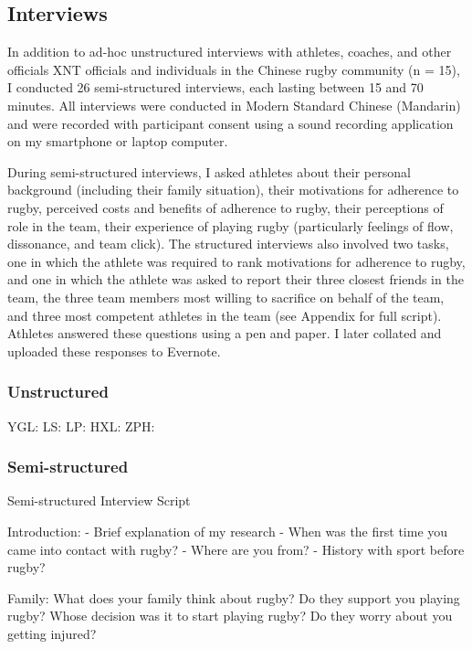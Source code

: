   \subsection{Interviews}

  In addition to ad-hoc unstructured interviews with athletes, coaches, and other officials XNT officials and individuals in the Chinese rugby community (n = 15), I conducted 26 semi-structured interviews, each lasting between 15 and 70 minutes.  All interviews were conducted in Modern Standard Chinese (Mandarin) and were recorded with participant consent using a sound recording application on my smartphone or laptop computer.

  During semi-structured interviews, I asked athletes about their personal background (including their family situation), their motivations for adherence to rugby, perceived costs and benefits of adherence to rugby, their perceptions of role in the team, their experience of playing rugby (particularly feelings of flow, dissonance, and team click).  The structured interviews also involved two tasks, one in which the athlete was required to rank motivations for adherence to rugby, and one in which the athlete was asked to report their three closest friends in the team, the three team members most willing to sacrifice on behalf of the team, and three most competent athletes in the team (see Appendix for full script). Athletes answered these questions using a pen and paper. I later collated and uploaded these responses to Evernote.

    \subsubsection{Unstructured}

YGL:
LS:
LP:
HXL:
ZPH:

    \subsubsection{Semi-structured} %

Semi-structured Interview Script

Introduction:
- Brief explanation of my research
- When was the first time you came into contact with rugby?
- Where are you from?
- History with sport before rugby?

Family:
What does your family think about rugby?
Do they support you playing rugby?
Whose decision was it to start playing rugby?
Do they worry about you getting injured?

